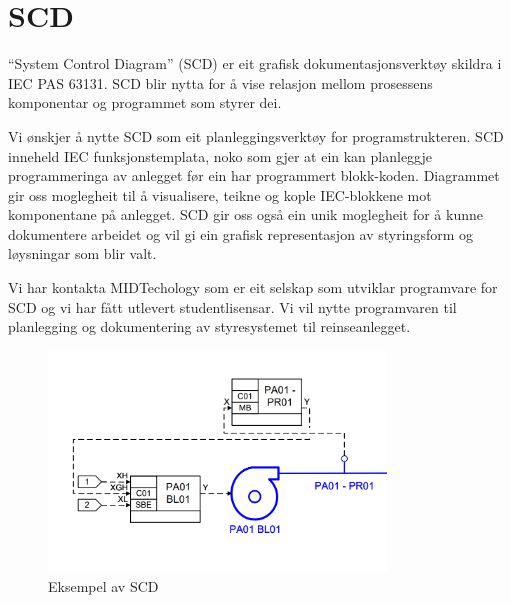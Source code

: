 \section{SCD}
\thispagestyle{fancy}


``System Control Diagram'' (\gls{SCD})  er eit grafisk dokumentasjonsverktøy skildra i \gls{IEC} \gls{PAS} 63131.\newline
 \gls{SCD} blir nytta for å vise relasjon mellom prosessens komponentar og programmet som styrer dei.
 
 Vi ønskjer å nytte \gls{SCD} som eit planleggingsverktøy for programstrukteren. \gls{SCD} inneheld \gls{IEC} funksjonstemplata, noko som gjer at ein kan
 planleggje programmeringa av anlegget før ein har programmert blokk-koden.
 Diagrammet gir oss moglegheit til å visualisere, teikne og kople \gls{IEC}-blokkene mot komponentane på anlegget.
 \gls{SCD} gir oss også ein unik moglegheit for å kunne dokumentere arbeidet og vil gi ein grafisk representasjon
 av styringsform og løysningar som blir valt.

 Vi har kontakta MIDTechology \citep{MIDT} som er eit selskap som utviklar programvare for \gls{SCD} og vi har fått utlevert studentlisensar. 
 Vi vil nytte programvaren til planlegging og dokumentering av styresystemet til reinseanlegget. \newline \newline \newline

 \begin{figure}[htbp]
    \centering
    \includegraphics[width=0.8\textwidth]{Bilder/Visio_eksempel.png}
    \caption{Eksempel av \gls{SCD}}\label{fig:SCD eksempel}    
\end{figure}

\newpage